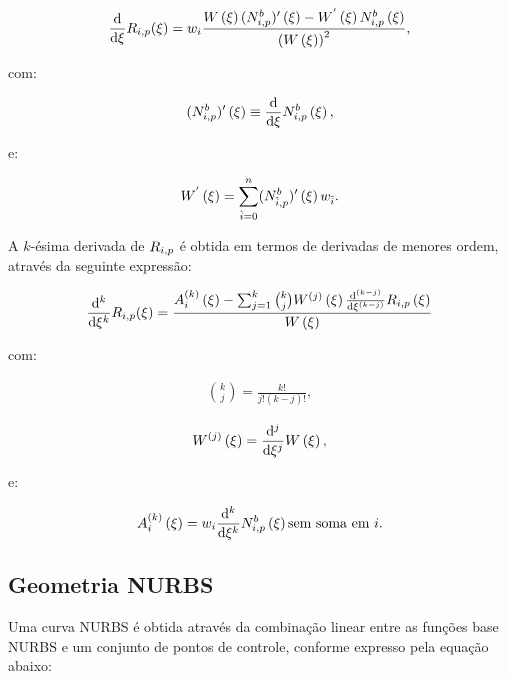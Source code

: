 \documentclass[tese_patricia]{subfiles}
\begin{document}
\begin{align}
	\frac{\mathrm{d}}{\mathrm{d} \xi} R_{i,p}(\xi) = w_{i} \frac{W\left(\xi\right)(N^{b}_{i,p})'\left(\xi\right) - W^{'}\left(\xi\right)N^b_{i,p}\left(\xi\right)}{\left(W\left(\xi\right)\right)^2},
\end{align}

\noindent com:

\begin{align}
	(N^{b}_{i,p})'\left(\xi\right) \equiv \frac{\mathrm{d}}{\mathrm{d} \xi} N^b_{i,p}\left(\xi\right),
\end{align}

\noindent e:

\begin{align}
	W^{'}\left(\xi\right) = \sum_{\hat{i}=0}^{n} (N^{b}_{\hat{i},p})' \left(\xi\right) w_{\hat{i}}.
\end{align}

A $k$-ésima derivada de $R_{i,p}$ é obtida em termos de derivadas de menores ordem, através da seguinte expressão:

\begin{align}
\frac{\mathrm{d}^{k}}{\mathrm{d} \xi^{k}} R_{i,p}(\xi) = \frac{A_{i}^{\left(k\right)} \left(\xi\right) - \sum_{j=1}^{k} \binom{k}{j} W^{\left(j\right)} \left(\xi\right) \frac{\mathrm{d}^{(k-j)}}{\mathrm{d} \xi^{(k-j)}}R_{i,p} \left(\xi\right)}{W\left(\xi\right)}
\end{align}

\noindent com:

\begin{align}
\binom{k}{j} = \frac{k!}{j!\left(k-j\right)!} ,
\end{align}

\begin{align}
	W^{\left(j\right)}\left(\xi\right) = \frac{\mathrm{d}^{j}}{\mathrm{d} \xi^{j}} W \left(\xi\right) ,
\end{align}

\noindent e:

\begin{align}
 A_{i}^{\left(k\right)} \left(\xi\right)  = w_i \frac{\mathrm{d}^k}{\mathrm{d}\xi^k}N^b_{i,p} \left(\xi\right)\text{sem soma em $i$}.
\end{align}

\subsection{Geometria NURBS}

Uma curva NURBS é obtida através da combinação linear entre as funções base NURBS e um conjunto de pontos de controle, conforme expresso pela equação abaixo: 
\end{document}
